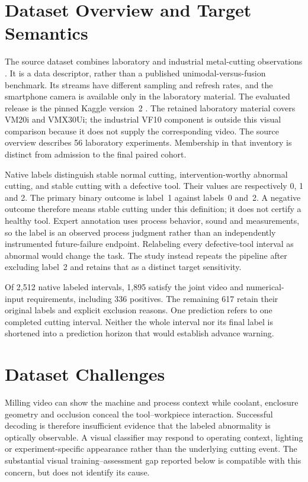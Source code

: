 \section{Dataset Overview and Target Semantics}
The source dataset combines laboratory and industrial metal-cutting observations
\citep{Kim2026MSM}. It is a data descriptor, rather than a published
unimodal-versus-fusion benchmark. Its streams have different sampling and refresh rates,
and the smartphone camera is available only in the laboratory material. The evaluated
release is the pinned Kaggle version~2 \citep{MSMKaggle2025}. The retained laboratory
material covers VM20i and VMX30Ui; the industrial VF10 component is outside this visual
comparison because it does not supply the corresponding video. The source overview
describes 56 laboratory experiments. Membership in that inventory is distinct from
admission to the final paired cohort.

Native labels distinguish stable normal cutting, intervention-worthy abnormal cutting,
and stable cutting with a defective tool. Their values are respectively 0, 1 and 2. The
primary binary outcome is label~1 against labels~0 and~2. A negative outcome therefore
means stable cutting under this definition; it does not certify a healthy tool. Expert
annotation uses process behavior, sound and measurements, so the label is an observed
process judgment rather than an independently instrumented future-failure endpoint.
Relabeling every defective-tool interval as abnormal would change the task. The study
instead repeats the pipeline after excluding label~2 and retains that as a distinct
target sensitivity.

Of 2,512 native labeled intervals, 1,895 satisfy the joint video and numerical-input
requirements, including 336 positives. The remaining 617 retain their original labels
and explicit exclusion reasons. One prediction refers to one completed cutting interval.
Neither the whole interval nor its final label is shortened into a prediction horizon
that would establish advance warning.

\section{Dataset Challenges}
Milling video can show the machine and process context while coolant, enclosure geometry
and occlusion conceal the tool--workpiece interaction. Successful decoding is therefore
insufficient evidence that the labeled abnormality is optically observable. A visual
classifier may respond to operating context, lighting or experiment-specific appearance
rather than the underlying cutting event. The substantial visual training--assessment
gap reported below is compatible with this concern, but does not identify its cause.

